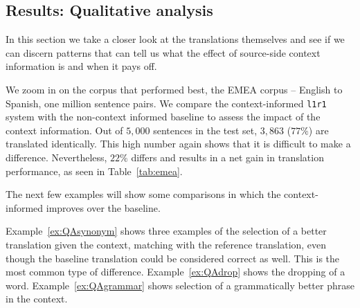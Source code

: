 \documentclass[smallextended]{svjour3}       %
\theoremstyle{break}
\begin{document}
\subsection{Results: Qualitative analysis}

In this section we take a closer look at the translations themselves and see if
we can discern patterns that can tell us what the effect of source-side context
information is and when it pays off.

We zoom in on the corpus that performed best, the EMEA corpus -- English to
Spanish, one million sentence pairs. We compare the context-informed
\texttt{l1r1} system with the non-context informed baseline to assess the
impact of the context information. Out of $5,000$ sentences in the test set,
$3,863$ ($77\%$) are translated identically. This high number again shows that
it is difficult to make a difference. Nevertheless, $22\%$ differs and results
in a net gain in translation performance, as seen in Table~\ref{tab:emea}.

The next few examples will show some comparisons in which the context-informed
improves over the baseline. 

Example~\ref{ex:QAsynonym} shows three examples of the selection of a better
translation given the context, matching with the reference translation, even
though the baseline translation could be considered correct as well. This is
the most common type of difference. Example~\ref{ex:QAdrop} shows the dropping
of a word. Example~\ref{ex:QAgrammar} shows selection of a grammatically better
phrase in the context.
\end{document}
